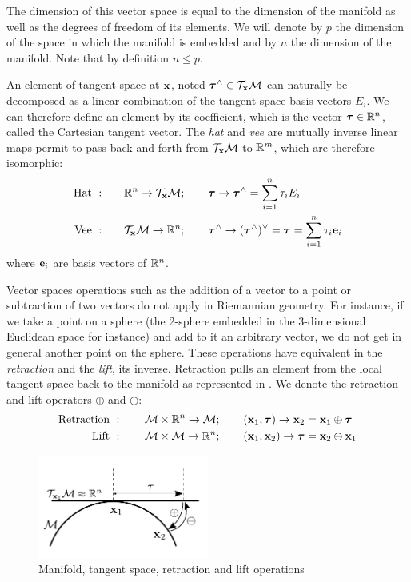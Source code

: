 The dimension of this vector space is equal to the dimension of the manifold as well as the degrees of freedom of its elements.
We will denote by $p$ the dimension of the space in which the manifold is embedded and by $n$ the dimension of the manifold.
Note that by definition $n \leq p$.  

An element of tangent space at ${\bf x}$, noted ${\bm \tau}^\wedge \in \mathcal{T}_{{\bf x}}\mathcal{M}$ can naturally be decomposed as a linear combination 
of the tangent space basis vectors $E_i$. We can therefore define an element by its coefficient, which is the vector ${\bm \tau} \in \mathbb{R}^n$, called the Cartesian tangent vector.
The \textit{hat} and \textit{vee} are mutually inverse linear maps permit to pass back and forth from $\mathcal{T}_{{\bf x}}\mathcal{M}$ to $\mathbb{R}^m$, which are therefore isomorphic:
%
\begin{align}
    \text{Hat} ~ :& \quad\quad \mathbb{R}^n \rightarrow \mathcal{T}_{{\bf x}}\mathcal{M}; \quad\quad {\bm \tau} \rightarrow {\bm \tau}^\wedge = \sum_{i=1}^n\tau_i E_i  \\
    \text{Vee} ~ :& \quad\quad \mathcal{T}_{{\bf x}}\mathcal{M} \rightarrow \mathbb{R}^n; \quad\quad {\bm \tau}^\wedge \rightarrow ({\bm \tau}^\wedge)^\vee = {\bm \tau} = \sum_{i=1}^n\tau_i {\bf e}_i
\end{align}
%
where ${\bf e}_i$ are basis vectors of $\mathbb{R}^n$.

Vector spaces operations such as the addition of a vector to a point or subtraction of two vectors do not apply in Riemannian geometry. For instance, if we
take a point on a sphere (the 2-sphere embedded in the 3-dimensional Euclidean space for instance) and add to it an arbitrary vector, we do not get in general
another point on the sphere. These operations have equivalent in the \textit{retraction} and the \textit{lift}, its inverse.
Retraction pulls an element from the local tangent space back to the manifold as represented in . We denote the retraction and lift operators 
$\oplus$ and $\ominus$:
%
\begin{align}
    \text{Retraction}~&: \quad\quad \mathcal{M} \times \mathbb{R}^n \rightarrow \mathcal{M}; \quad\quad ({\bf x}_1,{\bm \tau}) \rightarrow {\bf x}_2 = {\bf x}_1 \oplus {\bm \tau}   \\
    \text{Lift}~      &: \quad\quad \mathcal{M} \times \mathcal{M} \rightarrow \mathbb{R}^n; \quad\quad ({\bf x}_1,{\bf x}_2) \rightarrow {\bm \tau} = {\bf x}_2 \ominus {\bf x}_1
    \label{eq:retract_lift}
\end{align}


\begin{figure}[h]
    \centering
    \includegraphics[width=0.5\textwidth]{figures/manifold.pdf}
    \caption{Manifold, tangent space, retraction and lift operations}
    \label{fig:manifold}
\end{figure}


